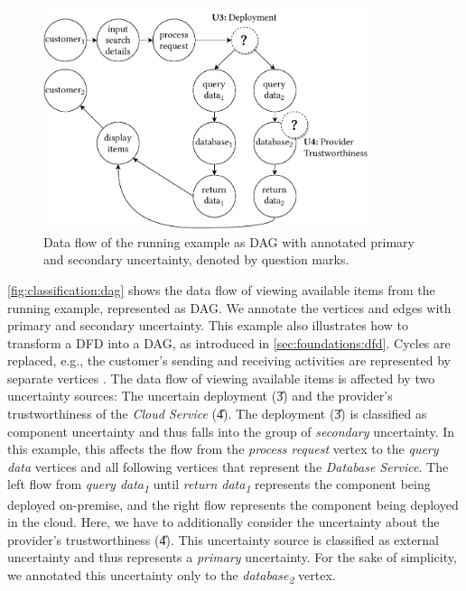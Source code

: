 \begin{figure}
    \centering
    \includegraphics[width=0.85\textwidth]{figures/chapter5/onlineshop-dag.pdf}
    \caption{Data flow of the running example as \acf*{DAG} with annotated primary and secondary uncertainty, denoted by question marks.}
    \label{fig:classification:dag}
\end{figure}

\autoref{fig:classification:dag} shows the data flow of viewing available items from the running example, represented as \ac{DAG}.
We annotate the vertices and edges with primary and secondary uncertainty.
This example also illustrates how to transform a \ac{DFD} into a \ac{DAG}, as introduced in \autoref{sec:foundations:dfd}.
Cycles are replaced, e.g., the customer's sending and receiving activities are represented by separate vertices \cite{canfora_data_1992}.
The data flow of viewing available items is affected by two uncertainty sources: The uncertain deployment (\U{3}) and the provider's trustworthiness of the \emph{Cloud Service} (\U{4}).
The deployment (\U{3}) is classified as component uncertainty and thus falls into the group of \emph{secondary} uncertainty.
In this example, this affects the flow from the \emph{process request} vertex to the \emph{query data} vertices and all following vertices that represent the \emph{Database Service}.
The left flow from \emph{query data\textsubscript{1}} until \emph{return data\textsubscript{1}} represents the component being deployed on-premise, and the right flow represents the component being deployed in the cloud.
Here, we have to additionally consider the uncertainty about the provider's trustworthiness (\U{4}).
This uncertainty source is classified as external uncertainty and thus represents a \emph{primary} uncertainty.
For the sake of simplicity, we annotated this uncertainty only to the \emph{database\textsubscript{2}} vertex.

